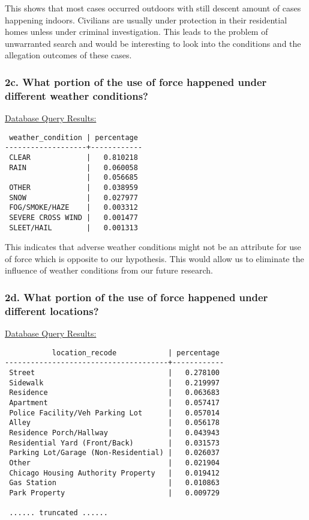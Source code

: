 \documentclass[10pt]{article}
\begin{document}
This shows that most cases occurred outdoors with still descent amount of cases happening indoors. Civilians are usually under protection in their residential homes unless under criminal investigation. This leads to the problem of unwarranted search and would be interesting to look into the conditions and the allegation outcomes of these cases.

\subsubsection*{2c. What portion of the use of force happened under different weather conditions?}

\underline{Database Query Results:}

\begin{verbatim}
 weather_condition | percentage
-------------------+------------
 CLEAR             |   0.810218
 RAIN              |   0.060058
                   |   0.056685
 OTHER             |   0.038959
 SNOW              |   0.027977
 FOG/SMOKE/HAZE    |   0.003312
 SEVERE CROSS WIND |   0.001477
 SLEET/HAIL        |   0.001313
\end{verbatim}

This indicates that adverse weather conditions might not be an attribute for use of force which is opposite to our hypothesis. This would allow us to eliminate the influence of weather conditions from our future research.

\subsubsection*{2d. What portion of the use of force happened under different locations?}

\underline{Database Query Results:}

\begin{verbatim}
           location_recode            | percentage
--------------------------------------+------------
 Street                               |   0.278100
 Sidewalk                             |   0.219997
 Residence                            |   0.063683
 Apartment                            |   0.057417
 Police Facility/Veh Parking Lot      |   0.057014
 Alley                                |   0.056178
 Residence Porch/Hallway              |   0.043943
 Residential Yard (Front/Back)        |   0.031573
 Parking Lot/Garage (Non-Residential) |   0.026037
 Other                                |   0.021904
 Chicago Housing Authority Property   |   0.019412
 Gas Station                          |   0.010863
 Park Property                        |   0.009729

 ...... truncated ......
\end{verbatim}
\end{document}
